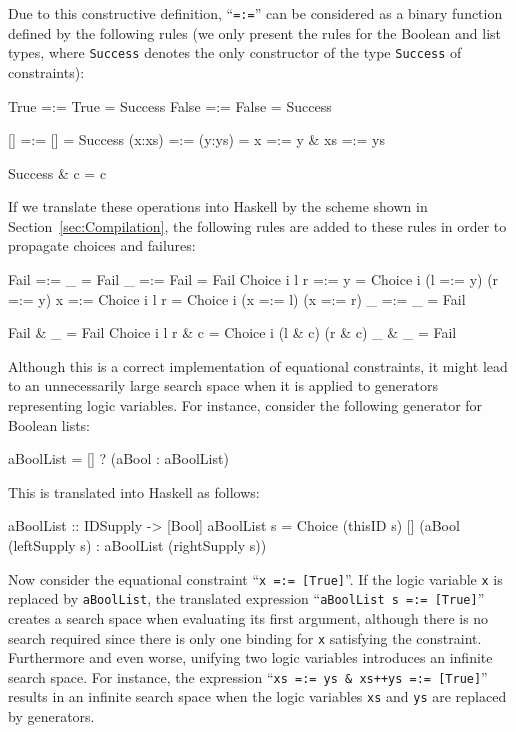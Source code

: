 \documentclass{llncs}
\newcommand{\code}[1]{\mbox{\small\texttt{#1}}}
\newcommand{\ccode}[1]{``\code{#1}''}
\begin{document}
Due to this constructive definition, \ccode{=:=}
can be considered as a binary function defined by the
following rules (we only present the rules for the Boolean
and list types, where \code{Success} denotes the only constructor
of the type \code{Success} of constraints):
\begin{curry}
  True   =:= True    =  Success
  False  =:= False   =  Success

  []     =:= []      =  Success
  (x:xs) =:= (y:ys)  =  x =:= y & xs =:= ys

  Success & c  =  c
\end{curry}
%
If we translate these operations into Haskell by the scheme
shown in Section~\ref{sec:Compilation},
the following rules are added to these rules
in order to propagate choices and failures:
\begin{haskell}
  Fail         =:= _             =  Fail
  _            =:= Fail          =  Fail
  Choice i l r =:= y             =  Choice i (l =:= y) (r =:= y)
  x            =:= Choice i l r  =  Choice i (x =:= l) (x =:= r)
  _            =:= _             =  Fail

  Fail         & _     =  Fail
  Choice i l r & c     =  Choice i (l & c) (r & c)
  _            & _     =  Fail

\end{haskell}
%
Although this is a correct implementation of equational constraints,
it might lead to an unnecessarily large search space
when it is applied to generators representing logic variables.
For instance, consider the following generator for Boolean lists:
\begin{curry}
  aBoolList = [] ? (aBool : aBoolList)
\end{curry}
This is translated into Haskell as follows:
\begin{haskell}
  aBoolList :: IDSupply -> [Bool]
  aBoolList s = Choice (thisID s) [] (aBool (leftSupply s)
                                      : aBoolList (rightSupply s))
\end{haskell}
Now consider the equational constraint \ccode{x =:= [True]}.
If the logic variable \code{x} is replaced by \code{aBoolList},
the translated expression \ccode{aBoolList s =:= [True]}
creates a search space when evaluating its first argument,
although there is no search required since there is only one
binding for \code{x} satisfying the constraint.
Furthermore and even worse, unifying two logic variables
introduces an infinite search space. For instance,
the expression \ccode{xs =:= ys \& xs++ys =:= [True]}
results in an infinite search space when the logic variables
\code{xs} and \code{ys} are replaced by generators.
\end{document}
